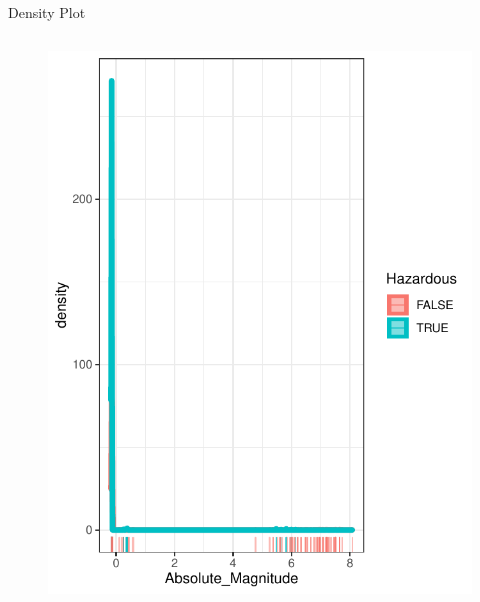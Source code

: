 \documentclass{beamer}
\begin{document}
\begin{frame}{Density Plot}
\begin{columns}
\begin{figure}[b]{\textwidth}
    \includegraphics[width=\textwidth]{Pic/DENSITY_Absolute_magnitude.pdf}
    \vspace{4ex}
  \end{figure}
\end{columns}
\end{frame}
\end{document}
